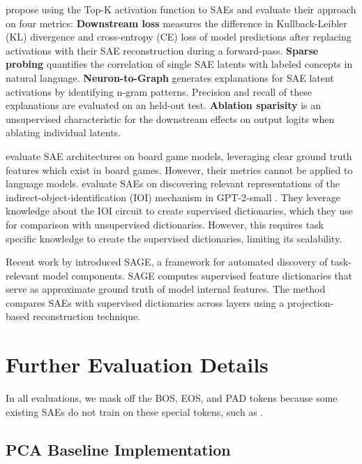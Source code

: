 \documentclass{article}
\theoremstyle{plain}
\theoremstyle{definition}
\theoremstyle{remark}
\begin{document}
\citet{gao2024scaling} propose using the Top-K activation function to SAEs and evaluate their approach on four metrics:
\textbf{ Downstream loss} measures the difference in Kullback-Leibler (KL) divergence and cross-entropy (CE) loss of model predictions after replacing activations with their SAE reconstruction during a forward-pass.
\textbf{Sparse probing} quantifies the correlation of single SAE latents with labeled concepts in natural language.
\textbf{Neuron-to-Graph} generates explanations for SAE latent activations by identifying n-gram patterns. Precision and recall of these explanations are evaluated on an held-out test.
\textbf{Ablation sparisity} is an unsupervised characteristic for the downstream effects on output logits when ablating individual latents.

\citet{karvonen2024measuringprogressdictionarylearning} evaluate SAE architectures on board game models, leveraging clear ground truth features which exist in board games. However, their metrics cannot be applied to language models. \citet{makelov2024principledevaluationssparseautoencoders} evaluate SAEs on discovering relevant representations of the indirect-object-identification (IOI) mechanism in GPT-2-small \citet{wang2022interpretabilitywildcircuitindirect}. They leverage knowledge about the IOI circuit to create supervised dictionaries, which they use for comparison with unsupervised dictionaries. However, this requires task specific knowledge to create the supervised dictionaries, limiting its scalability.

Recent work by \citet{venhoff2024sagescalablegroundtruth} introduced SAGE, a framework for automated discovery of task-relevant model components. SAGE computes supervised feature dictionaries that serve as approximate ground truth of model internal features.  The method compares SAEs with supervised dictionaries across layers using a projection-based reconstruction technique.

\clearpage
\section{Further Evaluation Details}
\label{app:eval-details}

In all evaluations, we mask off the BOS, EOS, and PAD tokens because some existing SAEs do not train on these special tokens, such as \citet{lieberum2024gemmascopeopensparse}.

\subsection*{PCA Baseline Implementation}
\end{document}
